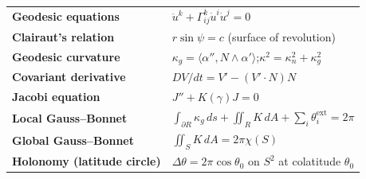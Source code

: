 \documentclass[11pt, a4paper]{article}
\newcommand{\kp}{\kappa}
\begin{document}
\begin{center}
\begin{tabular}{>{\bfseries}p{4.8cm} p{8.8cm}}
Geodesic equations & $\ddot{u}^k+\Gamma_{ij}^k\dot{u}^i\dot{u}^j=0$ \\
Clairaut's relation & $r\sin\psi=c$ (surface of revolution) \\
Geodesic curvature & $\kp_g=\langle\alpha'',N\wedge\alpha'\rangle$;\quad $\kp^2=\kp_n^2+\kp_g^2$ \\
Covariant derivative & $DV/dt=V'-(V'\cdot N)N$ \\
Jacobi equation & $J''+K(\gamma)J=0$ \\
Local Gauss--Bonnet & $\int_{\partial R}\kp_g\,ds+\iint_R K\,dA+\sum_i\theta_i^{\text{ext}}=2\pi$ \\
Global Gauss--Bonnet & $\iint_S K\,dA=2\pi\chi(S)$ \\
Holonomy (latitude circle) & $\Delta\theta=2\pi\cos\theta_0$ on $S^2$ at colatitude $\theta_0$ \\
\bottomrule
\end{tabular}
\end{center}
\end{document}
